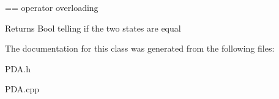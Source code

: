 == operator overloading 

\begin{DoxyReturn}{Returns}
Bool telling if the two states are equal 
\end{DoxyReturn}


The documentation for this class was generated from the following files\-:\begin{DoxyCompactItemize}
\item 
P\-D\-A.\-h\item 
P\-D\-A.\-cpp\end{DoxyCompactItemize}
